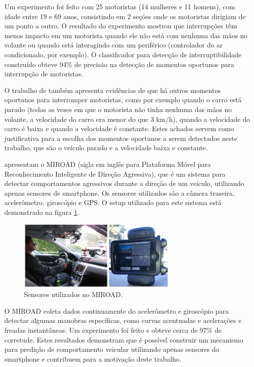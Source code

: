 Um experimento foi feito com 25 motoristas (14 mulheres e 11 homens), com idade entre 19 e 69 anos, consistindo em 2 seções
onde os motoristas dirigiam de um ponto a outro. O resultado do experimento mostrou que interrupções têm menos impacto em um motorista
quando ele não está com nenhuma das mãos no volante ou quando está interagindo com um periférico (controlador do ar condicionado, por exemplo).
O classificador para detecção de interruptibilidade construído obteve 94\% de precisão na detecção de momentos
oportunos para interrupção de motoristas.

O trabalho de  também apresenta evidências de que há outros momentos oportunos para interromper motoristas, como
por exemplo quando o carro está parado (todas as vezes em que o motorista não tinha nenhuma das mãos no volante, a velocidade do carro era menor
do que 3 km/h), quando a velocidade do carro é baixa e quando a velocidade é constante. Estes achados servem como justificativa para a
escolha dos momentos oportunos a serem detectados neste trabalho, que são o veículo parado e a velocidade baixa e constante.


 apresentam o MIROAD (sigla em inglês para Plataforma Móvel para Reconhecimento
Inteligente de Direção Agressiva), que é um sistema para detectar comportamentos agressivos durante a direção de um veículo, utilizando
apenas sensores de smartphone. Os sensores utilizados são a câmera traseira, acelerômetro, giroscópio e GPS. O setup utilizado para este
sistema está demonstrado na figura \ref{miroad}.

\begin{figure}[h]
\centering
\includegraphics[width=0.7\textwidth]{images/miroad.png}
\caption{Sensores utilizados no MIROAD. \cite{johnson2011driving}}
\label{miroad}
\end{figure}

O MIROAD coleta dados continuamente do acelerômetro e giroscópio para detectar algumas manobras específicas, como curvas acentuadas
e acelerações e freadas instantâneas.
Um experimento foi feito e obteve cerca de 97\% de corretude. Estes resultados demonstram que é possível construir
um mecanismo para predição de comportamento veicular utilizando apenas sensores do smartphone e contribuem para a motivação deste trabalho.

